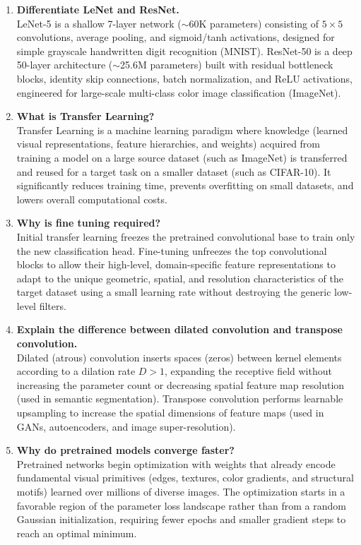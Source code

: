 \documentclass[11pt]{article}
\begin{document}
\begin{enumerate}
    \item \textbf{Differentiate LeNet and ResNet.} \\
    LeNet-5 is a shallow 7-layer network ($\sim$60K parameters) consisting of $5\times5$ convolutions, average pooling, and sigmoid/tanh activations, designed for simple grayscale handwritten digit recognition (MNIST). ResNet-50 is a deep 50-layer architecture ($\sim$25.6M parameters) built with residual bottleneck blocks, identity skip connections, batch normalization, and ReLU activations, engineered for large-scale multi-class color image classification (ImageNet).

    \item \textbf{What is Transfer Learning?} \\
    Transfer Learning is a machine learning paradigm where knowledge (learned visual representations, feature hierarchies, and weights) acquired from training a model on a large source dataset (such as ImageNet) is transferred and reused for a target task on a smaller dataset (such as CIFAR-10). It significantly reduces training time, prevents overfitting on small datasets, and lowers overall computational costs.

    \item \textbf{Why is fine tuning required?} \\
    Initial transfer learning freezes the pretrained convolutional base to train only the new classification head. Fine-tuning unfreezes the top convolutional blocks to allow their high-level, domain-specific feature representations to adapt to the unique geometric, spatial, and resolution characteristics of the target dataset using a small learning rate without destroying the generic low-level filters.

    \item \textbf{Explain the difference between dilated convolution and transpose convolution.} \\
    Dilated (atrous) convolution inserts spaces (zeros) between kernel elements according to a dilation rate $D > 1$, expanding the receptive field without increasing the parameter count or decreasing spatial feature map resolution (used in semantic segmentation). Transpose convolution performs learnable upsampling to increase the spatial dimensions of feature maps (used in GANs, autoencoders, and image super-resolution).

    \item \textbf{Why do pretrained models converge faster?} \\
    Pretrained networks begin optimization with weights that already encode fundamental visual primitives (edges, textures, color gradients, and structural motifs) learned over millions of diverse images. The optimization starts in a favorable region of the parameter loss landscape rather than from a random Gaussian initialization, requiring fewer epochs and smaller gradient steps to reach an optimal minimum.


\end{enumerate}
\end{document}
